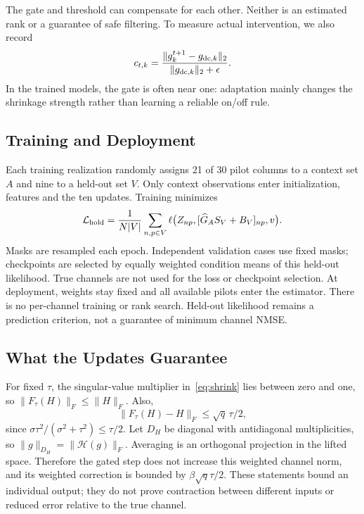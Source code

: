 \documentclass[10pt,journal,letterpaper]{IEEEtran}
\newcommand{\HH}{\mathcal{H}}
\begin{document}
The gate and threshold can compensate for each other. Neither is an estimated rank or a guarantee of safe filtering. To measure actual intervention, we also record
\begin{equation}
 c_{t,k}=\frac{\|g_k^{t+1}-g_{{\rm dc},k}\|_2}{\|g_{{\rm dc},k}\|_2+\epsilon}.
\end{equation}
In the trained models, the gate is often near one: adaptation mainly changes the shrinkage strength rather than learning a reliable on/off rule.

\subsection{Training and Deployment}
Each training realization randomly assigns 21 of 30 pilot columns to a context set $A$ and nine to a held-out set $V$. Only context observations enter initialization, features and the ten updates. Training minimizes
\begin{equation}
 \mathcal L_{\rm hold}=\frac{1}{N|V|}\sum_{n,p\in V}
 \ell\big(Z_{np},[\widehat G_A S_V+B_V]_{np},v\big).
\end{equation}
Masks are resampled each epoch. Independent validation cases use fixed masks; checkpoints are selected by equally weighted condition means of this held-out likelihood. True channels are not used for the loss or checkpoint selection. At deployment, weights stay fixed and all available pilots enter the estimator. There is no per-channel training or rank search. Held-out likelihood remains a prediction criterion, not a guarantee of minimum channel NMSE.

\subsection{What the Updates Guarantee}
For fixed $\tau$, the singular-value multiplier in~\eqref{eq:shrink} lies between zero and one, so $\|F_\tau(H)\|_F\le\|H\|_F$. Also,
\begin{equation}
 \|F_\tau(H)-H\|_F\le\sqrt q\,\tau/2,
\end{equation}
since $\sigma\tau^2/(\sigma^2+\tau^2)\le\tau/2$. Let $D_H$ be diagonal with antidiagonal multiplicities, so $\|g\|_{D_H}=\|\HH(g)\|_F$. Averaging is an orthogonal projection in the lifted space. Therefore the gated step does not increase this weighted channel norm, and its weighted correction is bounded by $\beta\sqrt q\tau/2$. These statements bound an individual output; they do not prove contraction between different inputs or reduced error relative to the true channel.
\end{document}
